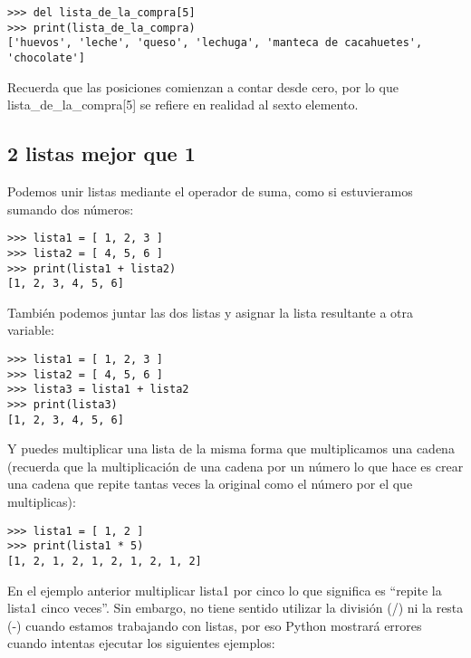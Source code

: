 \begin{listing}
\begin{verbatim}
>>> del lista_de_la_compra[5]
>>> print(lista_de_la_compra)
['huevos', 'leche', 'queso', 'lechuga', 'manteca de cacahuetes', 'chocolate']
\end{verbatim}
\end{listing}

Recuerda que las posiciones comienzan a contar desde cero, por lo que lista\_de\_la\_compra[5] se refiere en realidad al sexto elemento.

\subsection*{\color{BrickRed}2 listas mejor que 1}

Podemos unir listas mediante el operador de suma, como si estuvieramos sumando dos números:

\begin{listing}
\begin{verbatim}
>>> lista1 = [ 1, 2, 3 ]
>>> lista2 = [ 4, 5, 6 ]
>>> print(lista1 + lista2)
[1, 2, 3, 4, 5, 6]
\end{verbatim}
\end{listing}

\noindent
También podemos juntar las dos listas y asignar la lista resultante a otra variable:

\begin{listing}
\begin{verbatim}
>>> lista1 = [ 1, 2, 3 ]
>>> lista2 = [ 4, 5, 6 ]
>>> lista3 = lista1 + lista2
>>> print(lista3)
[1, 2, 3, 4, 5, 6]
\end{verbatim}
\end{listing}

\noindent
Y puedes multiplicar una lista de la misma forma que multiplicamos una cadena (recuerda que la multiplicación de una cadena por un número lo que hace es crear una cadena que repite tantas veces la original como el número por el que multiplicas):

\begin{listing}
\begin{verbatim}
>>> lista1 = [ 1, 2 ]
>>> print(lista1 * 5)
[1, 2, 1, 2, 1, 2, 1, 2, 1, 2]
\end{verbatim}
\end{listing}

\noindent
En el ejemplo anterior multiplicar lista1 por cinco lo que significa es ``repite la lista1 cinco veces''. Sin embargo, no tiene sentido utilizar la división (/) ni la resta (-) cuando estamos trabajando con listas, por eso Python mostrará errores cuando intentas ejecutar los siguientes ejemplos:


